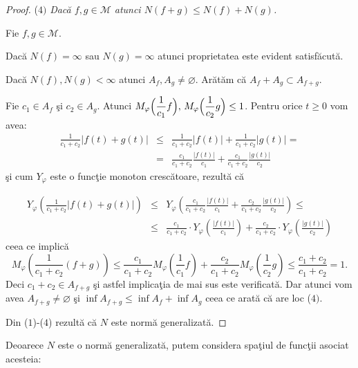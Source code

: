 \documentclass[ a4paper, 12pt]{report}
\theoremstyle{definition}
\theoremstyle{remark}
\numberwithin{equation}{section}
\begin{document}
\begin{proof}
\smallskip

($4)$  {\it Dac\u a $f,g \in \mathcal{M}$ atunci $N(f+g) \leq N(f) + N(g)$.}

\smallskip

Fie $f,g \in \mathcal{M}$.

Dac\u a $N(f) = \infty$ sau $N(g) = \infty$ atunci proprietatea este evident satisf\u acut\u a.

Dac\u a $N(f),N(g)<\infty$ atunci $A_f,A_g \neq \varnothing$. Ar\u at\u am c\u a $A_f + A_g \subset A_{f+g}$.

Fie $c_1 \in A_f$ \c si $c_2 \in A_g$. Atunci $M_\varphi\Big(\displaystyle\frac{1}{c_1}f \Big), \,  M_\varphi\Big(\displaystyle\frac{1}{c_2}g \Big) \leq 1$. Pentru orice  $t\geq 0$ vom avea:
\begin{eqnarray*}
\frac{1}{c_1+c_2}\lvert f(t)+g(t) \rvert &\leq& \frac{1}{c_1+c_2}\lvert f(t) \rvert + \frac{1}{c_1+c_2} \lvert g(t) \rvert = \\ &=&\frac{c_1}{c_1+c_2} \frac{\lvert f(t) \rvert}{c_1} + \frac{c_1}{c_1+c_2} \frac{\lvert g(t) \rvert}{c_2}
\end{eqnarray*}
\c si cum $Y_\varphi$ este o func\c tie monoton cresc\u atoare, rezult\u a c\u a


\begin{eqnarray*}
Y_\varphi \left (\frac{1}{c_1+c_2}\lvert f(t)+g(t) \rvert \right ) &\leq& Y_\varphi \left (\frac{c_1}{c_1+c_2} \frac{\lvert f(t) \rvert}{c_1} + \frac{c_2}{c_1+c_2} \frac{\lvert g(t) \rvert}{c_2}\right ) \leq \\
&\leq&\frac{c_1}{c_1+c_2} \cdot Y_\varphi \left (\frac{\lvert f(t) \rvert}{c_1}\right ) +  \frac{c_2}{c_1+c_2} \cdot Y_\varphi \left (\frac{\lvert g(t) \rvert}{c_2}\right )
 \end{eqnarray*}
 ceea ce implic\u a
$$M_\varphi \left(\frac{1}{c_1+c_2}(f+g)\right) \!\leq\! \frac{c_1}{c_1+c_2} M_\varphi \left (\frac{1}{c_1}f\right )+\! \frac{c_2}{c_1+c_2} M_\varphi\! \left(\frac{1}{c_2}g\right )\leq \frac{c_1+c_2}{c_1+c_2}=1.$$ Deci $c_1+c_2 \in A_{f+g}$ \c si astfel implica\c tia de mai sus este verificat\u a. Dar atunci vom avea $A_{f+g} \neq \varnothing$ \c si $\inf A_{f+g} \leq \inf A_f + \inf A_g$ ceea ce arat\u a c\u a are loc ($4)$.

\smallskip

Din ($1$)-($4$) rezult\u a c\u a $ N$ este norm\u a generalizat\u a.
\end{proof}

\medskip

Deoarece $N$ este o norm\u a generalizat\u a, putem considera spa\c tiul de func\c tii asociat acesteia:
\end{document}
